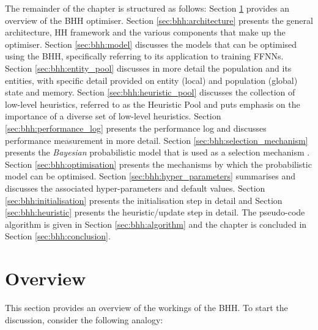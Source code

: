 The remainder of the chapter is structured as follows: Section \ref{sec:bhh:overview} provides an overview of the \Ac{BHH} optimiser. Section \ref{sec:bhh:architecture} presents the general architecture, \Ac{HH} framework and the various components that make up the optimiser. Section \ref{sec:bhh:model} discusses the models that can be optimised using the \Ac{BHH}, specifically referring to its application to training \acp{FFNN}. Section \ref{sec:bhh:entity_pool} discusses in more detail the population and its entities, with specific detail provided on entity (local) and population (global) state and memory. Section \ref{sec:bhh:heuristic_pool} discusses the collection of low-level heuristics, referred to as the Heuristic Pool and puts emphasis on the importance of a diverse set of low-level heuristics. Section \ref{sec:bhh:performance_log} presents the performance log and discusses performance measurement in more detail. Section \ref{sec:bhh:selection_mechanism} presents the \textit{Bayesian} probabilistic model that is used as a selection mechanism . Section \ref{sec:bhh:optimisation} presents the mechanisms by which the probabilistic model can be optimised. Section \ref{sec:bhh:hyper_parameters} summarises and discusses the associated hyper-parameters and default values. Section \ref{sec:bhh:initialisation} presents the initialisation step in detail and Section \ref{sec:bhh:heuristic} presents the heuristic/update step in detail. The pseudo-code algorithm is given in Section \ref{sec:bhh:algorithm} and the chapter is concluded in Section \ref{sec:bhh:conclusion}.


\section{Overview}
\label{sec:bhh:overview}

This section provides an overview of the workings of the \Ac{BHH}. To start the discussion, consider the following analogy:
\\

